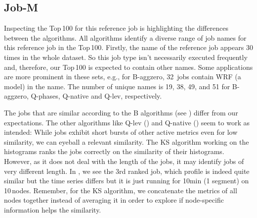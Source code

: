 \documentclass{jhps}
\begin{document}
%


\subsection{Job-M}

Inspecting the Top\,100 for this reference job is highlighting the differences between the algorithms.
All algorithms identify a diverse range of job names for this reference job in the Top\,100.
Firstly, the name of the reference job appears 30 times in the whole dataset.
So this job type isn't necessarily executed frequently and, therefore, our Top\,100 is expected to contain other names.
Some applications are more prominent in these sets, e.g., for B-aggzero, 32~jobs contain WRF (a model) in the name.
The number of unique names is 19, 38, 49, and 51 for B-aggzero, Q-phases, Q-native and Q-lev, respectively.

The jobs that are similar according to the B algorithms (see ) differ from our expectations.
The other algorithms like Q-lev () and Q-native () seem to work as intended:
While jobs exhibit short bursts of other active metrics even for low similarity, we can eyeball a relevant similarity.
The KS algorithm working on the histograms ranks the jobs correctly on the similarity of their histograms.
However, as it does not deal with the length of the jobs, it may identify jobs of very different length.
In , we see the 3rd ranked job, which profile is indeed quite similar but the time series differs but it is just running for 10min (1 segment) on 10\,nodes.
Remember, for the KS algorithm, we concatenate the metrics of all nodes together instead of averaging it in order to explore if node-specific information helps the  similarity.
\end{document}
